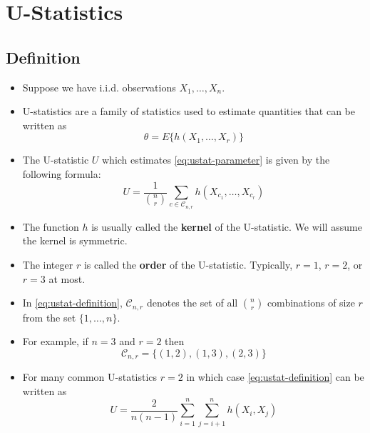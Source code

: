 \documentclass[]{book}
\begin{document}
\hypertarget{ustat}{%
\chapter{U-Statistics}\label{ustat}}

\hypertarget{definition-3}{%
\section{Definition}\label{definition-3}}

\begin{itemize}
\item
  Suppose we have i.i.d. observations \(X_{1}, \ldots, X_{n}\).
\item
  U-statistics are a family of statistics used to estimate quantities
  that can be written as
  \begin{equation}
  \theta = E\Big\{ h(X_{1}, \ldots, X_{r})  \Big\}
  \label{eq:ustat-parameter}
  \end{equation}
\item
  The U-statistic \(U\) which estimates \eqref{eq:ustat-parameter} is given by the following formula:
  \begin{equation}
  U = \frac{1}{{n \choose r}} \sum_{c \in \mathcal{C}_{n,r}} h(X_{c_{1}}, \ldots, X_{c_{r}})
  \label{eq:ustat-definition}
  \end{equation}
\item
  The function \(h\) is usually called the \textbf{kernel} of the U-statistic.
  We will assume the kernel is symmetric.
\item
  The integer \(r\) is called the \textbf{order} of the U-statistic. Typically,
  \(r=1\), \(r = 2\), or \(r = 3\) at most.
\item
  In \eqref{eq:ustat-definition}, \(\mathcal{C}_{n,r}\) denotes the set of all \({n \choose r}\) combinations of size
  \(r\) from the set \(\{1, \ldots, n\}\).
\item
  For example, if \(n = 3\) and \(r = 2\) then
  \begin{equation}
  \mathcal{C}_{n, r} = \{ (1,2), (1,3), (2, 3) \} \nonumber
  \end{equation}
\item
  For many common U-statistics \(r=2\) in which case \eqref{eq:ustat-definition} can be written as
  \begin{equation}
  U = \frac{2}{n(n-1)} \sum_{i=1}^{n}\sum_{j=i+1}^{n} h(X_{i}, X_{j})
  \end{equation}
\end{itemize}
\end{document}
